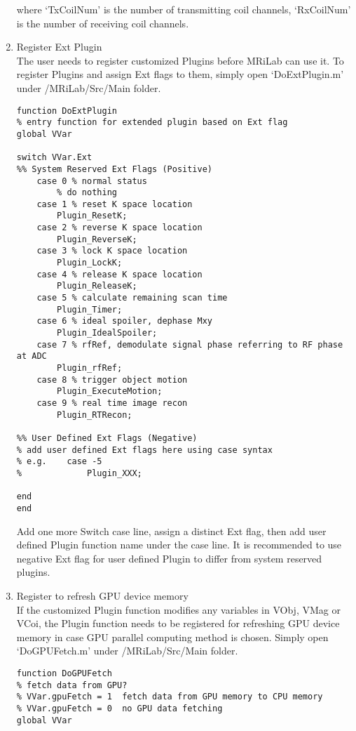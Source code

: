 \documentclass{book}%
\begin{document}
\begin{enumerate}
where `TxCoilNum' is the number of transmitting coil channels, `RxCoilNum' is the number of receiving coil channels.

\item Register Ext Plugin \\

The user needs to register customized Plugins before MRiLab can use it. To register Plugins and assign Ext flags to them, simply open `DoExtPlugin.m' under /MRiLab/Src/Main folder.

\begin{verbatim}
function DoExtPlugin
% entry function for extended plugin based on Ext flag
global VVar

switch VVar.Ext
%% System Reserved Ext Flags (Positive)   
    case 0 % normal status
        % do nothing
    case 1 % reset K space location
        Plugin_ResetK;
    case 2 % reverse K space location
        Plugin_ReverseK;
    case 3 % lock K space location
        Plugin_LockK;
    case 4 % release K space location
        Plugin_ReleaseK;
    case 5 % calculate remaining scan time
        Plugin_Timer;
    case 6 % ideal spoiler, dephase Mxy
        Plugin_IdealSpoiler;
    case 7 % rfRef, demodulate signal phase referring to RF phase at ADC
        Plugin_rfRef;
    case 8 % trigger object motion
        Plugin_ExecuteMotion;
    case 9 % real time image recon
        Plugin_RTRecon;

%% User Defined Ext Flags (Negative)
% add user defined Ext flags here using case syntax
% e.g.    case -5
%             Plugin_XXX;

end
end
\end{verbatim}

Add one more Switch case line, assign a distinct Ext flag, then add user defined Plugin function name under the case line. It is recommended to use negative Ext flag for user defined Plugin to differ from system reserved plugins.

\item Register to refresh GPU device memory \\

If the customized Plugin function modifies any variables in VObj, VMag or VCoi, the Plugin function needs to be registered for refreshing GPU device memory in case GPU parallel computing method is chosen. Simply open `DoGPUFetch.m' under /MRiLab/Src/Main folder.

\begin{verbatim}
function DoGPUFetch
% fetch data from GPU?
% VVar.gpuFetch = 1  fetch data from GPU memory to CPU memory
% VVar.gpuFetch = 0  no GPU data fetching
global VVar


\end{verbatim}
\end{enumerate}
\end{document}
